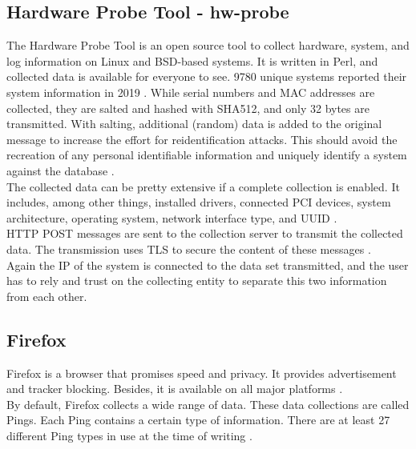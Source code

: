     \subsection{Hardware Probe Tool - hw-probe}
        The Hardware Probe Tool is an open source tool to collect hardware, system, and log information on Linux and BSD-based systems. It is written in Perl, and collected data is available for everyone to see. 9780 unique systems reported their system information in 2019 \cite{ponomarenko_linux_nodate}.
        While serial numbers and MAC addresses are collected, they are salted and hashed with SHA512, and only 32 bytes are transmitted. With salting, additional (random) data is added to the original message to increase the effort for reidentification attacks.
        This should avoid the recreation of any personal identifiable information and uniquely identify a system against the database  \cite{project_linuxhwhw-probe_2020}.\\
        The collected data can be pretty extensive if a complete collection is enabled. It includes, among other things, installed drivers, connected PCI devices, system architecture, operating system, network interface type, and UUID \cite{project_linuxhwhw-probe_2020}.\\
        
        HTTP POST messages are sent to the collection server to transmit the collected data. The transmission uses TLS to secure the content of these messages \cite{project_linuxhwhw-probe_2020}.\\
        Again the IP of the system is connected to the data set transmitted, and the user has to rely and trust on the collecting entity to separate this two information from each other.\\
    


\newpage
    \subsection{Firefox}
        Firefox is a browser that promises speed and privacy. It provides advertisement and tracker blocking. Besides, it is available on all major platforms \cite{mozilla_corporation_download_nodate}.\\ 
        By default, Firefox collects a wide range of data. These data collections are called Pings. Each Ping contains a certain type of information. There are at least 27 different Ping types in use at the time of writing \cite{mozilla_telemetry_nodate}.
        
